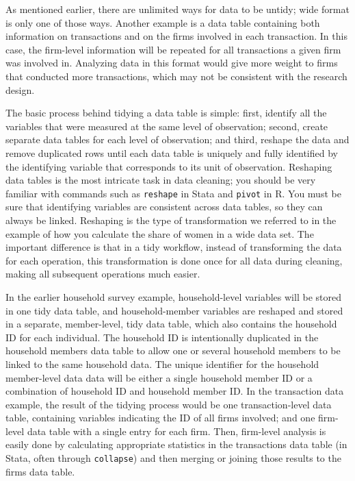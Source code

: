 As mentioned earlier, there are unlimited ways for data to be untidy; 
wide format is only one of those ways.
Another example is a data table containing both information on transactions
and on the firms involved in each transaction.
In this case, the firm-level information will be repeated
for all transactions a given firm was involved in.
Analyzing data in this format would give more weight
to firms that conducted more transactions,
which may not be consistent with the research design.

The basic process behind tidying a data table is simple:
first, identify all the variables that were measured at the same level of observation;
second, create separate data tables for each level of observation;
and third, reshape
the data and remove duplicated rows
until each data table is uniquely and fully identified by the identifying variable
that corresponds to its unit of observation.
Reshaping data tables is the most intricate task in data cleaning;
you should be very familiar with commands such as
\texttt{reshape} in Stata and \texttt{pivot} in R.
You must be sure that identifying variables are consistent across data tables,
so they can always be linked.
Reshaping is the type of transformation we referred to
in the example of how you calculate 
the share of women in a wide data set. 
The important difference is that 
in a tidy workflow,
instead of transforming the data for each operation,
this transformation is done once for all data during cleaning,
making all subsequent operations much easier.

In the earlier household survey example,
household-level variables will be stored in one tidy data table,
and household-member variables are reshaped
and stored in a separate, member-level, tidy data table,
which also contains the household ID for each individual.
The household ID is intentionally duplicated in the household members data table
to allow one or several household members to be linked to the same household data.
The unique identifier for the household member-level data data will be
either a single household member ID or
a combination of household ID and household member ID.
In the transaction data example,
the result of the tidying process would be one transaction-level data table,
containing variables indicating the ID of all firms involved;
and one firm-level data table with a single entry for each firm.
Then, firm-level analysis is easily done
by calculating appropriate statistics in the transactions data table
(in Stata, often through \texttt{collapse})
and then merging or joining those results to the firms data table.

